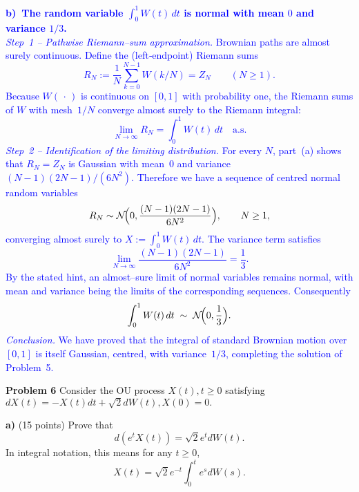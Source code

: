 \documentclass{article}
\begin{document}
\textcolor{blue}{
    \textbf{b) The random variable $\displaystyle\int_{0}^{1}W(t)\,dt$ is normal with mean $0$ and variance $1/3$.}   \\
\emph{Step 1 – Pathwise Riemann–sum approximation.}  
Brownian paths are almost surely continuous.  Define the (left‑endpoint) Riemann sums  
$$
R_N:=\frac1N\sum_{k=0}^{N-1}W(k/N)=Z_N\qquad(N\ge1).
$$
Because $W(\,\cdot\,)$ is continuous on $[0,1]$ with probability one, the Riemann sums of $W$ with mesh $1/N$ converge almost surely to the Riemann integral:  
$$
\lim_{N\to\infty}R_N=\int_{0}^{1}W(t)\,dt\quad\text{a.s.}
$$
\emph{Step 2 – Identification of the limiting distribution.}  
For every $N$, part (a) shows that $R_N=Z_N$ is Gaussian with mean $0$ and variance $(N-1)(2N-1)/(6N^{2})$.  Therefore we have a sequence of centred normal random variables
$$
R_N\sim\mathcal{N}\!\Bigl(0,\frac{(N-1)(2N-1)}{6N^{2}}\Bigr),\qquad N\ge1,
$$
converging almost surely to $X:=\displaystyle\int_{0}^{1}W(t)\,dt$.  The variance term satisfies
$$
\lim_{N\to\infty}\frac{(N-1)(2N-1)}{6N^{2}}=\frac13.
$$
By the stated hint, an almost–sure limit of normal variables remains normal, with mean and variance being the limits of the corresponding sequences.  Consequently
$$
\int_{0}^{1}W(t)\,dt\;\sim\;\mathcal{N}\!\Bigl(0,\frac13\Bigr).
$$
\emph{Conclusion.}  
We have proved that the integral of standard Brownian motion over $[0,1]$ is itself Gaussian, centred, with variance $1/3$, completing the solution of Problem 5.
}



\textbf{Problem 6}   Consider the OU process $X(t), t \geq 0$ satisfying 
$dX(t) = -X(t)dt + \sqrt{2}dW(t),   X(0) = 0.$

\textbf{a)}   (15 points) Prove that 
$$d(e^t X(t)) = \sqrt{2}e^t dW(t).$$
In integral notation, this means for any $t \geq 0$,
$$X(t) = \sqrt{2}e^{-t} \int_0^t e^s dW(s).$$
\end{document}
